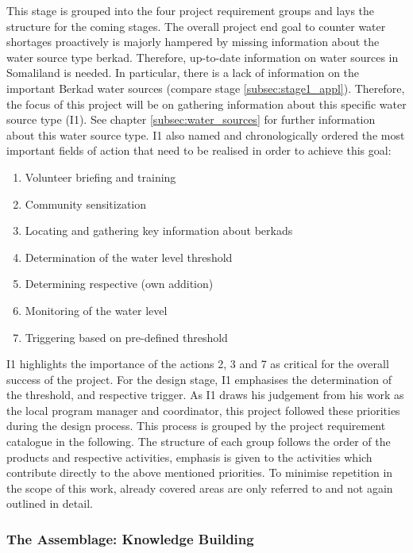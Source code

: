 This stage is grouped into the four project requirement groups and lays the structure for the coming stages. The overall project end goal to counter water shortages proactively is majorly hampered by missing information about the water source type berkad. Therefore, up-to-date information on water sources in Somaliland is needed. In particular, there is a lack of information on the important Berkad water sources (compare stage \ref*{subsec:stage1_appl}). Therefore, the focus of this project will be on gathering information about this specific water source type (I1). See chapter \ref*{subsec:water_sources} for further information about this water source type. I1 also named and chronologically ordered the most important fields of action that need to be realised in order to achieve this goal:

\begin{enumerate}
    \item Volunteer briefing and training
    \item Community sensitization
    \item Locating and gathering key information about berkads
    \item Determination of the water level threshold 
    \item Determining respective  (own addition)
    \item Monitoring of the water level
    \item Triggering  based on pre-defined threshold    
\end{enumerate}

I1 highlights the importance of the actions 2, 3 and 7 as critical for the overall success of the project. For the design stage, I1 emphasises the determination of the threshold,  and respective trigger. As I1 draws his judgement from his work as the local program manager and coordinator, this project followed these priorities during the design process. This process is grouped by the project requirement catalogue in the following. The structure of each group follows the order of the products and respective activities, emphasis is given to the activities which contribute directly to the above mentioned priorities. To minimise repetition in the scope of this work, already covered areas are only referred to and not again outlined in detail. 

\subsubsection{The Assemblage: Knowledge Building}\label{subsubsec:assemblage}


